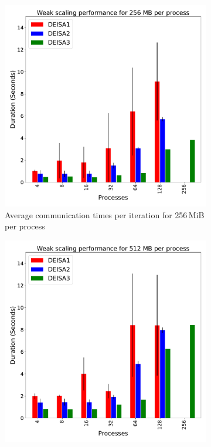 \begin{figure}[h!]
\begin{subfigure}[b]{0.4\textwidth}
         \includegraphics[width=\textwidth, height=\textwidth]{figures/256MB_1vs2vs3.pdf}
         \caption{Average communication times per iteration for 256\,MiB per process}
         \label{fig:X2_256}
     \end{subfigure}
     \vfill
     \begin{subfigure}[b]{0.4\textwidth}
         \centering
         \includegraphics[width=\textwidth, height=\textwidth]{figures/512MB_1vs2vs3.pdf}

\end{subfigure}
\end{figure}
